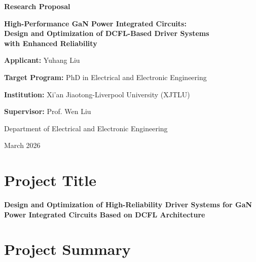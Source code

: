 \documentclass[12pt,a4paper]{article}
\begin{document}
\begin{titlepage}
    \centering
    \vspace*{2cm}
    
    {\LARGE\bfseries Research Proposal\par}
    \vspace{1.5cm}
    
    {\Large\bfseries High-Performance GaN Power Integrated Circuits:\\[0.3cm]
    Design and Optimization of DCFL-Based Driver Systems\\[0.3cm]
    with Enhanced Reliability\par}
    
    \vspace{2cm}
    
    {\large\textbf{Applicant:} Yuhang Liu\par}
    \vspace{0.5cm}
    {\large\textbf{Target Program:} PhD in Electrical and Electronic Engineering\par}
    \vspace{0.5cm}
    {\large\textbf{Institution:} Xi'an Jiaotong-Liverpool University (XJTLU)\par}
    
    \vspace{2cm}
    
    {\large\textbf{Supervisor:} Prof. Wen Liu\par}
    \vspace{0.3cm}
    {\normalsize Department of Electrical and Electronic Engineering\par}
    
    \vfill
    
    {\large March 2026\par}
    
\end{titlepage}

\tableofcontents
\newpage


\section{Project Title}

\textbf{Design and Optimization of High-Reliability Driver Systems for GaN Power Integrated Circuits Based on DCFL Architecture}

\section{Project Summary}
\end{document}
